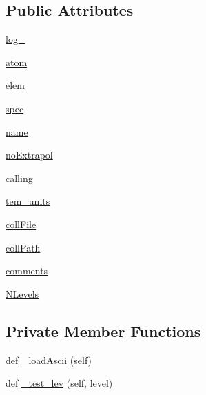 \subsection*{Public Attributes}
\begin{DoxyCompactItemize}
\item 
\hyperlink{classpyneb_1_1core_1_1pynebcore_1_1___coll_data_ascii_a9277c108416ceb0bbdca484a4a246b5c}{log\+\_\+}
\item 
\hyperlink{classpyneb_1_1core_1_1pynebcore_1_1___coll_data_ascii_a47fdeb51513849a90f420296a0383d33}{atom}
\item 
\hyperlink{classpyneb_1_1core_1_1pynebcore_1_1___coll_data_ascii_a2e7f8f27e94e2aa068d869cd4dad2ee2}{elem}
\item 
\hyperlink{classpyneb_1_1core_1_1pynebcore_1_1___coll_data_ascii_a75f41e91e7eb224162912bedac22b342}{spec}
\item 
\hyperlink{classpyneb_1_1core_1_1pynebcore_1_1___coll_data_ascii_a39c9697691d3e8e8d7f99c05e0baa4a9}{name}
\item 
\hyperlink{classpyneb_1_1core_1_1pynebcore_1_1___coll_data_ascii_aa4f6c8d0a2a8e4ac6503d67b4a51188d}{no\+Extrapol}
\item 
\hyperlink{classpyneb_1_1core_1_1pynebcore_1_1___coll_data_ascii_a08efc5898f4e03a1b7702d85f909e188}{calling}
\item 
\hyperlink{classpyneb_1_1core_1_1pynebcore_1_1___coll_data_ascii_ad026d62c0262a257b38f70a1d7b88c9b}{tem\+\_\+units}
\item 
\hyperlink{classpyneb_1_1core_1_1pynebcore_1_1___coll_data_ascii_a8f7186365d566d4de80bf20b41b51c75}{coll\+File}
\item 
\hyperlink{classpyneb_1_1core_1_1pynebcore_1_1___coll_data_ascii_aa407510c78da8c376cd7d82a2ec87ba4}{coll\+Path}
\item 
\hyperlink{classpyneb_1_1core_1_1pynebcore_1_1___coll_data_ascii_ace4b313bdacd14dea0112b9ff7fe0b7c}{comments}
\item 
\hyperlink{classpyneb_1_1core_1_1pynebcore_1_1___coll_data_ascii_a718c85715ee6ef5dfdd4136e2031030b}{N\+Levels}
\end{DoxyCompactItemize}
\subsection*{Private Member Functions}
\begin{DoxyCompactItemize}
\item 
def \hyperlink{classpyneb_1_1core_1_1pynebcore_1_1___coll_data_ascii_a2010732c9e4c8423831e82a3644aed60}{\+\_\+load\+Ascii} (self)
\item 
def \hyperlink{classpyneb_1_1core_1_1pynebcore_1_1___coll_data_ascii_a932859ccd799e220c26e9f9db0cdd0a6}{\+\_\+test\+\_\+lev} (self, level)
\end{DoxyCompactItemize}

